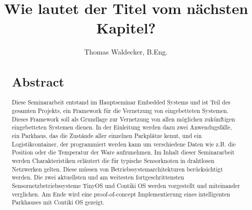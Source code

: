 \documentclass[bibtotocnumbered,titlepage]{scrartcl}
\title{Wie lautet der Titel vom nächsten Kapitel?}
\author{Thomas Waldecker, B.Eng.}
\date{}
\begin{document}
\maketitle
\begin{abstract}
\section*{Abstract}
Diese Seminararbeit entstand im Hauptseminar Embedded Systems und ist Teil des gesamten Projekts, ein Framework für die Vernetzung von eingebetteten Systemen. Dieses Framework soll als Grundlage zur Vernetzung von allen möglichen zukünftigen eingebetteten Systemen dienen. In der Einleitung werden dazu zwei Anwendugsfälle, ein Parkhaus, das die Zustände aller einzelnen Parkplätze kennt, und ein Logistikcontainer, der programmiert werden kann um verschiedene Daten wie z.B. die Position oder die Temperatur der Ware aufzunehmen. Im Inhalt dieser Seminararbeit werden Charakteristiken erläutert die für typische Sensorknoten in drahtlosen Netzwerken gelten. Diese müssen von Betriebssystemarchitekturen berücksichtigt werden. Die zwei aktuellsten und am weitesten fortgeschrittensten Sensornetzbetriebssysteme TinyOS und Contiki OS werden vorgestellt und miteinander verglichen. Am Ende wird eine proof-of-concept Implementierung eines intelligenten Parkhauses mit Contiki OS gezeigt.
\end{abstract}

\tableofcontents





\end{document}
